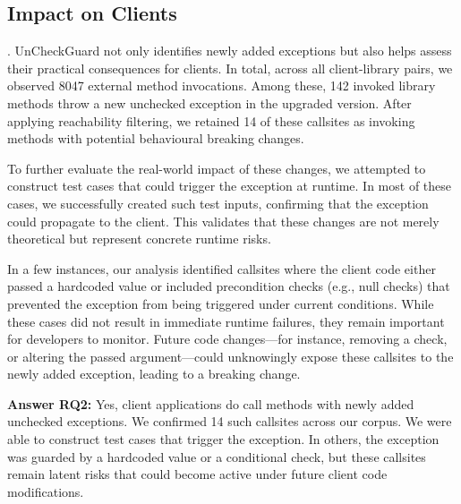 \subsection{Impact on Clients}

.
UnCheckGuard not only identifies newly added exceptions but also helps assess their practical consequences for clients. In total, across all client-library pairs, we observed 8047 external method invocations. Among these, 142 invoked library methods throw a new unchecked exception in the upgraded version. After applying reachability filtering, we retained 14 of these callsites as invoking methods with potential behavioural breaking changes. 

To further evaluate the real-world impact of these changes, we attempted to construct test cases that could trigger the exception at runtime. In most of these cases, we successfully created such test inputs, confirming that the exception could propagate to the client. This validates that these changes are not merely theoretical but represent concrete runtime risks.

In a few instances, our analysis identified callsites where the client code either passed a hardcoded value or included precondition checks (e.g., null checks) that prevented the exception from being triggered under current conditions. While these cases did not result in immediate runtime failures, they remain important for developers to monitor. Future code changes—for instance, removing a check, or altering the passed argument—could unknowingly expose these callsites to the newly added exception, leading to a breaking change.

\vspace{1em}
\begin{tcolorbox}[colback=gray!10, colframe=black]
\textbf{Answer RQ2:} Yes, client applications do call methods with newly added unchecked exceptions. We confirmed 14 such callsites across our corpus. We were able to construct test cases that trigger the exception. In others, the exception was guarded by a hardcoded value or a conditional check, but these callsites remain latent risks that could become active under future client code modifications.
\end{tcolorbox}
\vspace{1em}

